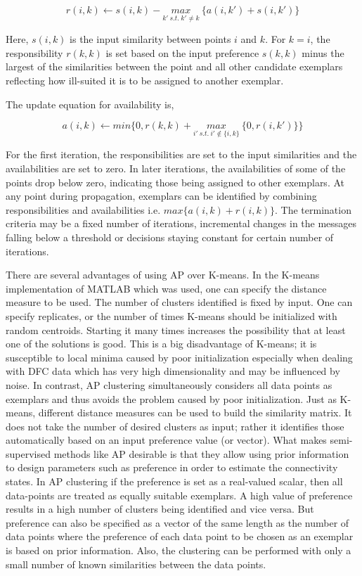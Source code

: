 \documentclass{article}
\begin{document}
\begin{equation}
r(i,k) \leftarrow s(i,k) - \underset{k'\: s.t.\: k'\neq k}{max}\:\{a(i,k')+s(i,k')\}
\end{equation}

Here, $s(i,k)$ is the input similarity between points $i$ and $k$. For $k=i$, the responsibility $r(k,k)$ is set based on the input preference $s(k,k)$ minus the largest of the similarities between the point and all other candidate exemplars reflecting how ill-suited it is to be assigned to another exemplar.

The update equation for availability is,

\begin{equation}
a(i,k) \leftarrow min \{ 0, r(k,k) + \underset{i'\: s.t.\: i'\notin\{i,k\}}{max}\: \{0,r(i,k')\} \}
\end{equation}

For the first iteration, the responsibilities are set to the input similarities and the availabilities are set to zero. In later iterations, the availabilities of some of the points drop below zero, indicating those being assigned to other exemplars. At any point during propagation, exemplars can be identified by combining responsibilities and availabilities i.e. $max\{a(i,k)+r(i,k)\}$. The termination criteria may be a fixed number of iterations, incremental changes in the messages falling below a threshold or decisions staying constant for certain number of iterations.

There are several advantages of using \ac{AP} over K-means. In the K-means implementation of MATLAB which was used, one can specify the distance measure to be used. The number of clusters identified is fixed by input. One can specify replicates, or the number of times K-means should be initialized with random centroids. Starting it many times increases the possibility that at least one of the solutions is good. This is a big disadvantage of K-means; it is susceptible to local minima caused by poor initialization especially when dealing with DFC data which has very high dimensionality and may be influenced by noise. In contrast, \ac{AP} clustering simultaneously considers all data points as exemplars and thus avoids the problem caused by poor initialization. Just as K-means, different distance measures can be used to build the similarity matrix. It does not take the number of desired clusters as input; rather it identifies those automatically based on an input preference value (or vector). What makes semi-supervised methods like \ac{AP} desirable is that they allow using prior information to design parameters such as preference in order to estimate the connectivity states. In \ac{AP} clustering if the preference is set as a real-valued scalar, then all data-points are treated as equally suitable exemplars. A high value of preference results in a high number of clusters being identified and vice versa. But preference can also be specified as a vector of the same length as the number of data points where the preference of each data point to be chosen as an exemplar is based on prior information. Also, the clustering can be performed with only a small number of known similarities between the data points. 
\end{document}
